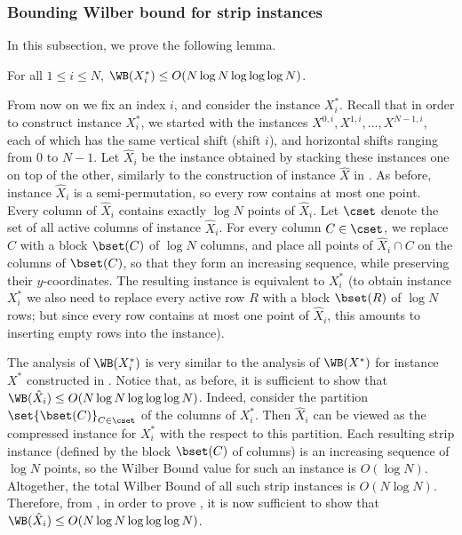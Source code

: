 \subsubsection{Bounding Wilber bound for strip instances}
In this subsection, we prove the following lemma.

\begin{lemma}\label{lem: bounding vertical WB for strip}
	For all $1\leq i\leq N$, $\WB(X^*_i)\leq O(N\log N\log\log\log N)$.
\end{lemma}

From now on we fix an index $i$, and consider the instance $X^*_i$. 
Recall that in order to construct instance $X^*_i$, we started with the instances $X^{0,i},X^{1,i},\ldots,X^{N-1,i}$, each of which has the same vertical shift (shift $i$), and horizontal shifts ranging from $0$ to $N-1$. Let $\hat X_i$ be the instance obtained by stacking these instances one on top of the other, similarly to the construction of instance $\hat X$ in . As before, instance $\hat X_i$ is a semi-permutation, so every row contains at most one point. Every column of $\hat X_i$ contains exactly $\log N$ points of $\hat X_i$. Let $\cset$ denote the set of all active columns of instance $\hat X_i$. For every column $C\in \cset$, we replace $C$ with a block $\bset(C)$ of $\log N$ columns, and place all points of $\hat X_i\cap C$ on the columns of $\bset(C)$, so that they form an increasing sequence, while preserving their $y$-coordinates. The resulting instance is equivalent to $X^*_i$ (to obtain instance $X^*_i$ we also need to replace every active row $R$ with a block $\bset(R)$ of $\log N$ rows; but since every row contains at most one point of $\hat X_i$, this amounts to inserting empty rows into the instance).

The analysis of $\WB(X^*_i)$ is very similar to the analysis of $\WB(X^*)$ for instance $X^*$ constructed in . Notice that, as before, it is sufficient to show that $\WB(\hat X_i)\leq  O(N\log N\log\log\log N)$.
Indeed, consider the partition $\set{\bset(C)}_{C\in \cset}$ of the columns of $X^*_i$. Then $\hat X_i$ can be viewed as the compressed instance for $X^*_i$ with the respect to this partition. Each resulting strip instance (defined by the block $\bset(C)$ of columns) is an increasing sequence of $\log N$ points, so the Wilber Bound value for such an instance is $O(\log N)$. Altogether, the total Wilber Bound of all such strip instances is $O(N\log N)$. Therefore, from , in order to prove , it is now sufficient to show that $\WB(\hat X_i)\leq O(N\log N\log\log\log N)$.


